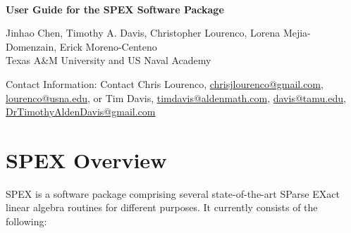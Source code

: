 \documentclass[12pt,oneside]{book}
\theoremstyle{definition}
\begin{document}
\thispagestyle{empty}
\begin{center}\begin{large}
    \phantom{.}\\[1in]
    \textbf{User Guide for the SPEX Software Package} \\
    \vspace{5mm}
    
    
    \vspace{20mm}
    
    Jinhao Chen, Timothy A. Davis, Christopher Lourenco, Lorena Mejia-Domenzain, Erick Moreno-Centeno \\
    Texas A\&M University and US Naval Academy
    \vspace{20mm}
    
    Contact Information: Contact Chris Lourenco, \href{mailto:chrisjlourenco@gmail.com}{chrisjlourenco@gmail.com}, \href{mailto:lourenco@usna.edu}{lourenco@usna.edu}, or Tim Davis,
    \href{mailto:timdavis@aldenmath.com}{timdavis@aldenmath.com},
    \href{mailto:davis@tamu.edu}{davis@tamu.edu},
    \href{mailto:DrTimothyAldenDavis@gmail.com}{DrTimothyAldenDavis@gmail.com}
\end{large}\end{center}



\newpage
\makeatletter{}\makeatother


\chapter{SPEX Overview}\vspace{-0.75in}
SPEX is a software package comprising several state-of-the-art SParse EXact
linear algebra routines for different purposes. It currently consists of the following:
\end{document}
